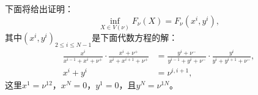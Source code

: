 下面将给出证明：
\begin{equation*}
    \inf_{X\in V(\nu)}F_{\nu}(X) = F_{\nu}(x^i,y^i),
\end{equation*}
其中$(x^i,y^i)_{2\leq i\leq N-1}$是下面代数方程的解：
\begin{equation}\label{equation}
    \begin{split}
    \frac{x^{i}}{x^{i-1}+x^{i}+\nu^+}\cdot\frac{x^{i}+\nu^+}{x^{i}+x^{i+1}+\nu^+}
    &= \frac{y^{i}+\nu^-}{y^{i-1}+y^{i}+\nu^-}\cdot\frac{y^{i}}{y^{i}+y^{i+1}+\nu^-},\\
    x^{i} + y^{i} &= \nu^{i,i+1},
    \end{split}
\end{equation}
这里$x^1=\nu^{12}$，$x^N=0$，$y^1=0$，且$y^N=\nu^{1N}$。


